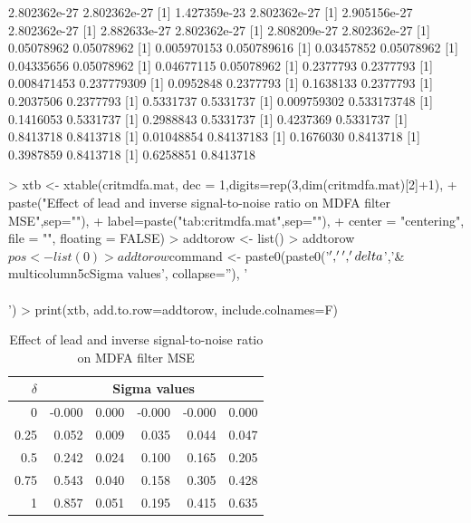 \documentclass[a4paper]{book}
\begin{document}
\begin{Schunk}
\begin{Soutput}
[1] 2.802362e-27 2.802362e-27
[1] 1.427359e-23 2.802362e-27
[1] 2.905156e-27 2.802362e-27
[1] 2.882633e-27 2.802362e-27
[1] 2.808209e-27 2.802362e-27
[1] 0.05078962 0.05078962
[1] 0.005970153 0.050789616
[1] 0.03457852 0.05078962
[1] 0.04335656 0.05078962
[1] 0.04677115 0.05078962
[1] 0.2377793 0.2377793
[1] 0.008471453 0.237779309
[1] 0.0952848 0.2377793
[1] 0.1638133 0.2377793
[1] 0.2037506 0.2377793
[1] 0.5331737 0.5331737
[1] 0.009759302 0.533173748
[1] 0.1416053 0.5331737
[1] 0.2988843 0.5331737
[1] 0.4237369 0.5331737
[1] 0.8413718 0.8413718
[1] 0.01048854 0.84137183
[1] 0.1676030 0.8413718
[1] 0.3987859 0.8413718
[1] 0.6258851 0.8413718
\end{Soutput}
\end{Schunk}

\begin{Schunk}
\begin{Sinput}
>  xtb <- xtable(critmdfa.mat, dec = 1,digits=rep(3,dim(critmdfa.mat)[2]+1),
+   paste("Effect of lead and  inverse signal-to-noise ratio on MDFA filter MSE",sep=""),
+   label=paste("tab:critmdfa.mat",sep=""),
+   center = "centering", file = "", floating = FALSE)
> addtorow <- list()
> addtorow$pos <- list(0)
> addtorow$command <- paste0(paste0('$','\\','delta$','& \\multicolumn{5}{c}{Sigma values}', collapse=''), '\\\\')
> print(xtb, add.to.row=addtorow, include.colnames=F)
\end{Sinput}
\begin{Soutput}
\begin{table}[ht]
\centering
\begin{tabular}{rrrrrr}
  \hline
  $\delta$& \multicolumn{5}{c}{Sigma values}\\ \hline
0 & -0.000 & 0.000 & -0.000 & -0.000 & 0.000 \\ 
  0.25 & 0.052 & 0.009 & 0.035 & 0.044 & 0.047 \\ 
  0.5 & 0.242 & 0.024 & 0.100 & 0.165 & 0.205 \\ 
  0.75 & 0.543 & 0.040 & 0.158 & 0.305 & 0.428 \\ 
  1 & 0.857 & 0.051 & 0.195 & 0.415 & 0.635 \\ 
   \hline
\end{tabular}
\caption{Effect of lead and  inverse signal-to-noise ratio on MDFA filter MSE} 
\label{tab:critmdfa.mat}
\end{table}
\end{Soutput}
\end{Schunk}
\end{document}
